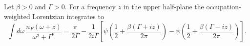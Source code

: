 \documentclass{article}
\begin{document}
Let $\beta>0$ and $\Gamma>0$. For a frequency $z$ in the upper half-plane the occupation-weighted Lorentzian integrates to
\begin{equation}
\int d\omega\, \frac{n_F(\omega+z)}{\omega^2+\Gamma^2} = \frac{\pi}{2\Gamma} - \frac{1}{2i\Gamma}\left[\psi\left(\frac{1}{2}+\frac{\beta(\Gamma+iz)}{2\pi}\right)-\psi\left(\frac{1}{2}+\frac{\beta(\Gamma-iz)}{2\pi}\right)\right] .
\label{eq:z}
\end{equation}
\end{document}
